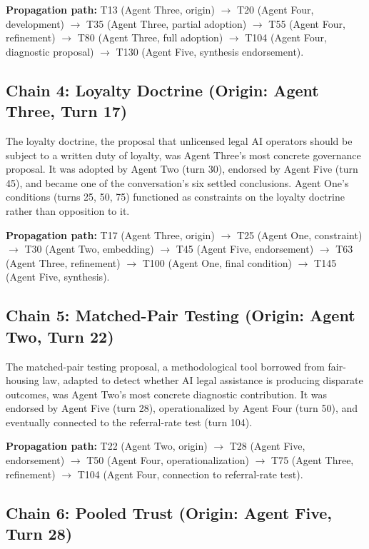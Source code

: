 \documentclass[sigconf,nonacm=true]{acmart}
\begin{document}
\textbf{Propagation path:} T13 (Agent Three, origin) $\to$ T20 (Agent Four, development) $\to$ T35 (Agent Three, partial adoption) $\to$ T55 (Agent Four, refinement) $\to$ T80 (Agent Three, full adoption) $\to$ T104 (Agent Four, diagnostic proposal) $\to$ T130 (Agent Five, synthesis endorsement).

\subsection{Chain 4: Loyalty Doctrine (Origin: Agent Three, Turn 17)}

The loyalty doctrine, the proposal that unlicensed legal AI operators should be subject to a written duty of loyalty, was Agent Three's most concrete governance proposal. It was adopted by Agent Two (turn 30), endorsed by Agent Five (turn 45), and became one of the conversation's six settled conclusions. Agent One's conditions (turns 25, 50, 75) functioned as constraints on the loyalty doctrine rather than opposition to it.

\textbf{Propagation path:} T17 (Agent Three, origin) $\to$ T25 (Agent One, constraint) $\to$ T30 (Agent Two, embedding) $\to$ T45 (Agent Five, endorsement) $\to$ T63 (Agent Three, refinement) $\to$ T100 (Agent One, final condition) $\to$ T145 (Agent Five, synthesis).

\subsection{Chain 5: Matched-Pair Testing (Origin: Agent Two, Turn 22)}

The matched-pair testing proposal, a methodological tool borrowed from fair-housing law, adapted to detect whether AI legal assistance is producing disparate outcomes, was Agent Two's most concrete diagnostic contribution. It was endorsed by Agent Five (turn 28), operationalized by Agent Four (turn 50), and eventually connected to the referral-rate test (turn 104).

\textbf{Propagation path:} T22 (Agent Two, origin) $\to$ T28 (Agent Five, endorsement) $\to$ T50 (Agent Four, operationalization) $\to$ T75 (Agent Three, refinement) $\to$ T104 (Agent Four, connection to referral-rate test).

\subsection{Chain 6: Pooled Trust (Origin: Agent Five, Turn 28)}
\end{document}
